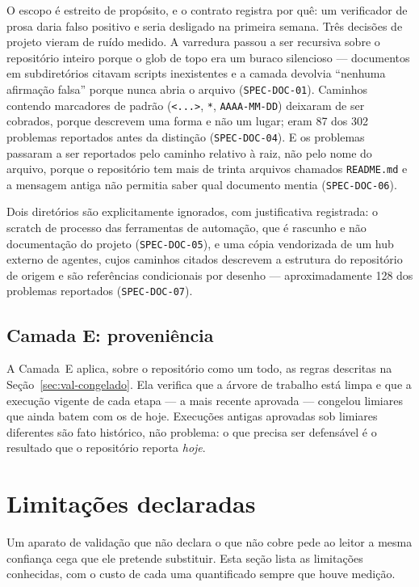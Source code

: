 O escopo é estreito de propósito, e o contrato registra por quê: um verificador de
prosa daria falso positivo e seria desligado na primeira semana. Três decisões de
projeto vieram de ruído medido. A varredura passou a ser recursiva sobre o
repositório inteiro porque o glob de topo era um buraco silencioso --- documentos
em subdiretórios citavam scripts inexistentes e a camada devolvia ``nenhuma
afirmação falsa'' porque nunca abria o arquivo (\texttt{SPEC-DOC-01}). Caminhos
contendo marcadores de padrão (\texttt{<...>}, \texttt{*}, \texttt{AAAA-MM-DD})
deixaram de ser cobrados, porque descrevem uma forma e não um lugar; eram 87 dos
302 problemas reportados antes da distinção (\texttt{SPEC-DOC-04}). E os
problemas passaram a ser reportados pelo caminho relativo à raiz, não pelo nome
do arquivo, porque o repositório tem mais de trinta arquivos chamados
\texttt{README.md} e a mensagem antiga não permitia saber qual documento mentia
(\texttt{SPEC-DOC-06}).

Dois diretórios são explicitamente ignorados, com justificativa registrada: o
scratch de processo das ferramentas de automação, que é rascunho e não
documentação do projeto (\texttt{SPEC-DOC-05}), e uma cópia vendorizada de um hub
externo de agentes, cujos caminhos citados descrevem a estrutura do repositório
de origem e são referências condicionais por desenho --- aproximadamente 128 dos
problemas reportados (\texttt{SPEC-DOC-07}).

\subsection{Camada E: proveniência}

A Camada~E aplica, sobre o repositório como um todo, as regras descritas na
Seção~\ref{sec:val-congelado}. Ela verifica que a árvore de trabalho está limpa e
que a execução vigente de cada etapa --- a mais recente aprovada --- congelou
limiares que ainda batem com os de hoje. Execuções antigas aprovadas sob limiares
diferentes são fato histórico, não problema: o que precisa ser defensável é o
resultado que o repositório reporta \textit{hoje}.

\section{Limitações declaradas}\label{sec:val-limitacoes}

Um aparato de validação que não declara o que não cobre pede ao leitor a mesma
confiança cega que ele pretende substituir. Esta seção lista as limitações
conhecidas, com o custo de cada uma quantificado sempre que houve medição.

